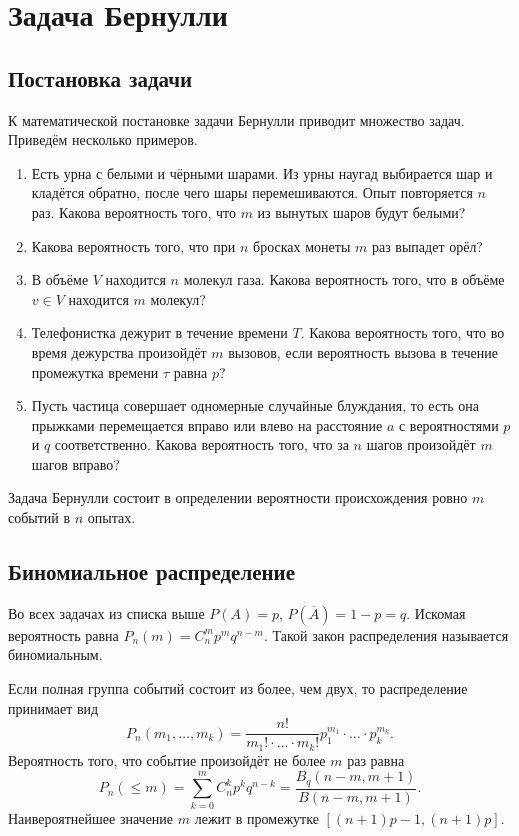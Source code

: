 \section{Задача Бернулли}
\subsection{Постановка задачи}
    К математической постановке задачи Бернулли приводит множество задач.
    Приведём несколько примеров.
    \begin{enumerate}
        \item Есть урна с белыми и чёрными шарами. Из урны наугад выбирается шар
            и кладётся обратно, после чего шары перемешиваются. Опыт повторяется
            \( n \) раз. Какова вероятность того, что \( m \) из вынутых шаров
            будут белыми?
        \item Какова вероятность того, что при \( n \) бросках монеты \( m \)
            раз выпадет орёл?
        \item В объёме \( V \) находится \( n \) молекул газа. Какова
            вероятность того, что в объёме \( v \in V \) находится
            \( m \) молекул?
        \item Телефонистка дежурит в течение времени \( T \). Какова вероятность
            того, что во время дежурства произойдёт \( m \) вызовов, если
            вероятность вызова в течение промежутка времени \( \tau \)
            равна \( p \)?
        \item Пусть частица совершает одномерные случайные блуждания, то есть
            она прыжками перемещается вправо или влево на расстояние \( a \) с
            вероятностями \( p \) и \( q \) соответственно. Какова вероятность
            того, что за \( n \) шагов произойдёт \( m \) шагов вправо?
    \end{enumerate}

    Задача Бернулли состоит в определении вероятности происхождения ровно
    \( m \) событий в \( n \) опытах.

\subsection{Биномиальное распределение}
    Во всех задачах из списка выше \( P(A) = p \), \( P(\overline{A}) = 1 - p =
    q \). Искомая вероятность равна \( P_n(m) = C_n^m p^m q^{n-m} \). Такой
    закон распределения называется биномиальным.

    Если полная группа событий состоит из более, чем двух, то распределение
    принимает вид
    \[
        P_n(m_1, \ldots, m_k) =
            \frac{n!}{m_1! \cdot\ldots\cdot m_k!}
            p_1^{m_1} \cdot\ldots\cdot p_k^{m_k}.
    \]
    Вероятность того, что событие произойдёт не более \( m \) раз равна
    \[
        P_n(\le m) = \sum_{k=0}^m C_n^k p^k q^{n-k} =
        \frac{B_q(n-m, m+1)}{B(n-m, m+1)}.
    \]
    Наивероятнейшее значение \( m \) лежит в промежутке
    \( [(n+1)p-1, (n+1)p] \).

